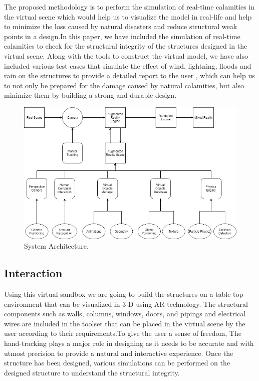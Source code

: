 \documentclass[conference]{IEEEtran}
\begin{document}
The proposed methodology is to perform the simulation of real-time calamities in the virtual scene which would help us to visualize the model in real-life and help to minimize the loss caused by natural disasters and reduce structural weak points in a design.In this paper, we have included the simulation of real-time calamities to check for the structural
integrity of the structures designed in the virtual scene. Along with the tools to construct the virtual model, we have also included various test cases that simulate the effect of wind, lightning, floods and rain on the structures to provide a detailed report to the user , which can help
us to not only be prepared for the damage caused by natural calamities, but also minimize them by building a strong and durable design.

\begin{figure}
	\includegraphics[width=\linewidth]{architecture.jpg}
	\caption{System Architecture.}
	\label{fig:system-architecture}
\end{figure}
\subsection{Interaction}
Using this virtual sandbox we are going to build the structures on a table-top environment that can be visualized in 3-D using AR technology. The structural components such as walls, columns, windows, doors, and pipings and electrical wires are included in the toolset that can be placed in the virtual scene by the user according to their requirements.To give the user a sense of freedom, The hand-tracking plays a major role in designing as it needs to be accurate and with utmost precision to provide a natural and interactive experience. Once the structure has been designed, various
simulations can be performed on the designed structure to understand the structural integrity.
\end{document}
